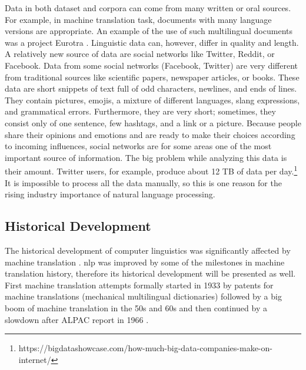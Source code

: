 Data in both dataset and corpora can come from many written or oral sources. For example, in machine translation task, documents with many language versions are appropriate. An example of the use of such multilingual documents was a project Eurotra \citep{oakley1995final}. Linguistic data can, however,  differ in quality and length.  A relatively new source of data are social networks like Twitter, Reddit, or Facebook. Data from some social networks (Facebook, Twitter) are very different from traditional sources like scientific papers, newspaper articles, or books.  These data are short snippets of text full of odd characters, newlines, and ends of lines. They contain pictures, emojis, a mixture of different languages, slang expressions, and grammatical errors. Furthermore, they are very short; sometimes, they consist only of one sentence, few hashtags, and a link or a picture. Because people share their opinions and emotions and are ready to make their choices according to incoming influences, social networks are for some areas one of the most important source of information. The big problem while analyzing this data is their amount. Twitter users, for example, produce about 12 TB of data per day.\footnote{https://bigdatashowcase.com/how-much-big-data-companies-make-on-internet/} It is impossible to process all the data manually, so this is one reason for the rising industry importance of natural language processing.

\subsection{Historical Development}
The historical development of computer linguistics was significantly affected by machine translation \citep{Wilks}. \acrshort{nlp} was improved by some of the milestones in machine translation history, therefore its historical development will be presented as well. First machine translation attempts formally started in 1933 by patents for machine translations (mechanical multilingual dictionaries) \citep{Hutchins}
followed by a big boom of machine translation in the 50s and 60s and then continued by a slowdown after ALPAC report in 1966 \citep{Hutchins1996}. 

